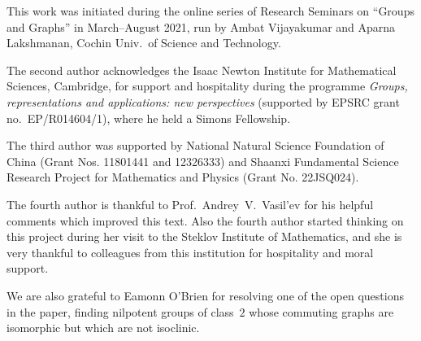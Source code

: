 \documentclass{elsarticle}
\begin{document}
This work was initiated during the online series of Research Seminars on
``Groups and Graphs'' in March--August 2021, run by Ambat Vijayakumar and
Aparna Lakshmanan, Cochin Univ.\ of Science and Technology.

The second author acknowledges the Isaac Newton Institute for Mathematical
Sciences, Cambridge, for support and hospitality during the programme
\textit{Groups, representations and applications: new perspectives}
(supported by \mbox{EPSRC} grant no.\ EP/R014604/1), where he held a Simons
Fellowship.

The third author was supported by National Natural Science Foundation of China (Grant Nos. 11801441 and 12326333) and  Shaanxi Fundamental Science Research Project for Mathematics and Physics (Grant No. 22JSQ024).

The fourth author is thankful to Prof.\ Andrey~V.\ Vasil'ev for his helpful comments which improved this text. Also the fourth author started thinking on this project during her visit to the Steklov Institute of Mathematics, and she is very thankful to colleagues from this institution for hospitality and moral support.

We are also grateful to Eamonn O'Brien for resolving one of the open questions
in the paper, finding nilpotent groups of class~$2$ whose commuting graphs are
isomorphic but which are not isoclinic.
\end{document}
